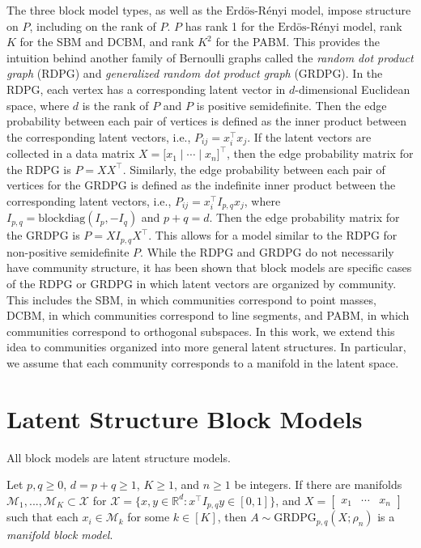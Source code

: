 \documentclass[12pt]{article}
\begin{document}
The three block model types, as well as the
\(\text{Erd\"{o}s-R\'{e}nyi}\) model, impose structure on \(P\),
including on the rank of \(P\). \(P\) has rank 1 for the
\(\text{Erd\"{o}s-R\'{e}nyi}\) model, rank \(K\) for the SBM and DCBM,
and rank \(K^2\) for the PABM. This provides the intuition behind
another family of Bernoulli graphs called the \emph{random dot product
graph} (RDPG) and \emph{generalized random dot product graph} (GRDPG).
In the RDPG, each vertex has a corresponding latent vector in
\(d\)-dimensional Euclidean space, where \(d\) is the rank of \(P\) and
\(P\) is positive semidefinite. Then the edge probability between each
pair of vertices is defined as the inner product between the
corresponding latent vectors, i.e., \(P_{ij} = x_i^\top x_j\). If the
latent vectors are collected in a data matrix
\(X = \bigl[ x_1 \mid \cdots \mid x_n \bigr]^\top\), then the edge
probability matrix for the RDPG is \(P = X X^\top\). Similarly, the edge
probability between each pair of vertices for the GRDPG is defined as
the indefinite inner product between the corresponding latent vectors,
i.e., \(P_{ij} = x_i^\top I_{p,q} x_j\), where
\(I_{p,q} = \mathrm{blockdiag}(I_p, -I_q)\) and \(p + q = d\). Then the
edge probability matrix for the GRDPG is \(P = X I_{p,q} X^\top\). This
allows for a model similar to the RDPG for non-positive semidefinite
\(P\). While the RDPG and GRDPG do not necessarily have community
structure, it has been shown that block models are specific cases of the
RDPG or GRDPG in which latent vectors are organized by community. This
includes the SBM, in which communities correspond to point masses, DCBM,
in which communities correspond to line segments, and PABM, in which
communities correspond to orthogonal subspaces. In this work, we extend
this idea to communities organized into more general latent structures.
In particular, we assume that each community corresponds to a manifold
in the latent space.

\hypertarget{latent-structure-block-models}{%
\section{Latent Structure Block
Models}\label{latent-structure-block-models}}

All block models are latent structure models.

\begin{definition}
Let $p, q \geq 0$, $d = p + q \geq 1$, $K \geq 1$, and $n \geq 1$ be integers.
If there are manifolds $\mathcal{M}_1, ..., \mathcal{M}_K \subset \mathcal{X}$ for $\mathcal{X} = \{x, y \in \mathbb{R}^d : x^\top I_{p,q} y \in [0, 1] \}$, and 
$X = \begin{bmatrix} x_1 & \cdots & x_n \end{bmatrix}$ such that each $x_i \in \mathcal{M}_k$ for some $k \in [K]$, then $A \sim \mathrm{GRDPG}_{p,q}(X; \rho_n)$ is a \emph{manifold block model}.
\end{definition}
\end{document}
